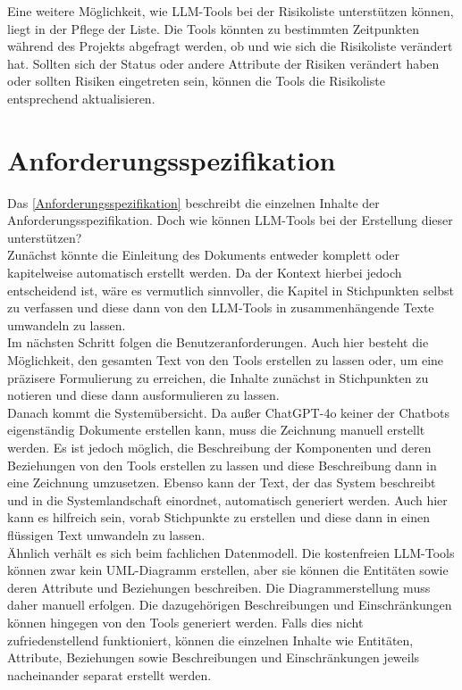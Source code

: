 Eine weitere Möglichkeit, wie LLM-Tools bei der Risikoliste unterstützen können, liegt in der Pflege der Liste. Die 
Tools könnten zu bestimmten Zeitpunkten während des Projekts abgefragt werden, ob und wie sich die Risikoliste 
verändert hat. Sollten sich der Status oder andere Attribute der Risiken verändert haben oder sollten Risiken 
eingetreten sein, können die Tools die Risikoliste entsprechend aktualisieren.

\section{Anforderungsspezifikation}  \label{LLMAnforderungsspezifikation}

Das \autoref{Anforderungsspezifikation} beschreibt die einzelnen Inhalte der Anforderungsspezifikation. Doch wie 
können LLM-Tools bei der Erstellung dieser unterstützen?\\

Zunächst könnte die Einleitung des Dokuments entweder komplett oder kapitelweise automatisch erstellt werden. Da der 
Kontext hierbei jedoch entscheidend ist, wäre es vermutlich sinnvoller, die Kapitel in Stichpunkten selbst zu 
verfassen und diese dann von den LLM-Tools in zusammenhängende Texte umwandeln zu lassen.\\

Im nächsten Schritt folgen die Benutzeranforderungen. Auch hier besteht die Möglichkeit, den gesamten Text von den 
Tools erstellen zu lassen oder, um eine präzisere Formulierung zu erreichen, die Inhalte zunächst in Stichpunkten zu 
notieren und diese dann ausformulieren zu lassen.\\

Danach kommt die Systemübersicht. Da außer ChatGPT-4o keiner der Chatbots eigenständig Dokumente erstellen kann, 
muss die Zeichnung manuell erstellt werden. Es ist jedoch möglich, die Beschreibung der Komponenten und deren 
Beziehungen von den Tools erstellen zu lassen und diese Beschreibung dann in eine Zeichnung umzusetzen. Ebenso 
kann der Text, der das System beschreibt und in die Systemlandschaft einordnet, automatisch generiert werden. Auch 
hier kann es hilfreich sein, vorab Stichpunkte zu erstellen und diese dann in einen flüssigen Text umwandeln zu lassen.\\

Ähnlich verhält es sich beim fachlichen Datenmodell. Die kostenfreien LLM-Tools können zwar kein UML-Diagramm erstellen, 
aber sie können die Entitäten sowie deren Attribute und Beziehungen beschreiben. Die Diagrammerstellung muss daher 
manuell erfolgen. Die dazugehörigen Beschreibungen und Einschränkungen können hingegen von den Tools generiert werden. 
Falls dies nicht zufriedenstellend funktioniert, können die einzelnen Inhalte wie Entitäten, Attribute, Beziehungen 
sowie Beschreibungen und Einschränkungen jeweils nacheinander separat erstellt werden.\\

